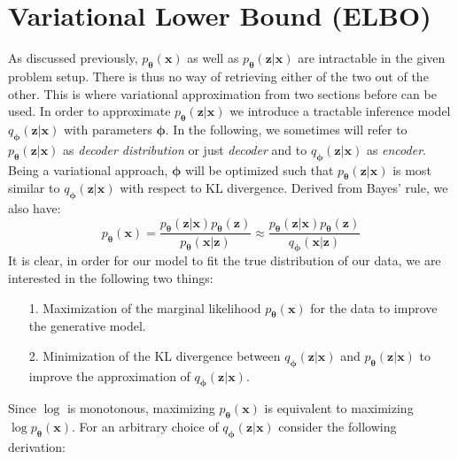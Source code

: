 \documentclass[12pt]{report}
\theoremstyle{definition}
\begin{document}
\section{Variational Lower Bound (ELBO)}
As discussed previously, $p_{\pmb{\theta}}(\mathbf{x})$ as well as $p_{\pmb{\theta}}(\mathbf{z}|\mathbf{x})$ are intractable in the given problem setup. There is thus no way of retrieving either of the two out of the other. This is where variational approximation from two sections before can be used. In order to approximate $p_{\pmb{\theta}}(\mathbf{z}|\mathbf{x})$ we introduce a tractable inference model $q_{\pmb{\phi}}(\mathbf{z}|\mathbf{x})$ with parameters $\pmb{\phi}$. In the following, we sometimes will refer to $p_{\pmb{\theta}}(\mathbf{z}|\mathbf{x})$ as \emph{decoder distribution} or just \emph{decoder} and to $q_{\pmb{\phi}}(\mathbf{z}|\mathbf{x})$ as \emph{encoder}. Being a variational approach,  $\pmb{\phi}$ will be optimized such that $p_{\pmb{\theta}}(\mathbf{z}|\mathbf{x})$ is most similar to $q_{\pmb{\phi}}(\mathbf{z}|\mathbf{x})$ with respect to KL divergence.
Derived from Bayes' rule, we also have:
\begin{equation}
	p_{\pmb{\theta}}(\mathbf{x}) = \frac{p_{\pmb{\theta}}(\mathbf{z}|\mathbf{x}) p_{\pmb{\theta}}(\mathbf{z})}{p_{\pmb{\theta}}(\mathbf{x}|\mathbf{z})} \approx  \frac{p_{\pmb{\theta}}(\mathbf{z}|\mathbf{x}) p_{\pmb{\theta}}(\mathbf{z})}{q_{\pmb{\phi}}(\mathbf{x}|\mathbf{z})}
\end{equation}
It is clear, in order for our model to fit the true distribution of our data, we are interested in the following two things:
\begin{itemize}
	\item[1.] Maximization of the marginal likelihood $p_{\pmb{\theta}}(\mathbf{x})$ for the data to improve the generative model.
	\item[2.] Minimization of the KL divergence between $q_{\pmb{\phi}}(\mathbf{z}|\mathbf{x})$ and $p_{\pmb{\theta}}(\mathbf{z}|\mathbf{x})$ to improve the approximation of $q_{\pmb{\phi}}(\mathbf{z}|\mathbf{x})$.
\end{itemize}
Since $\log$ is monotonous, maximizing $p_{\pmb{\theta}}(\mathbf{x})$ is equivalent to maximizing $\log p_{\pmb{\theta}}(\mathbf{x})$. For an arbitrary choice of $q_{\pmb{\phi}}(\mathbf{z}|\mathbf{x})$ consider the following derivation:
\end{document}
